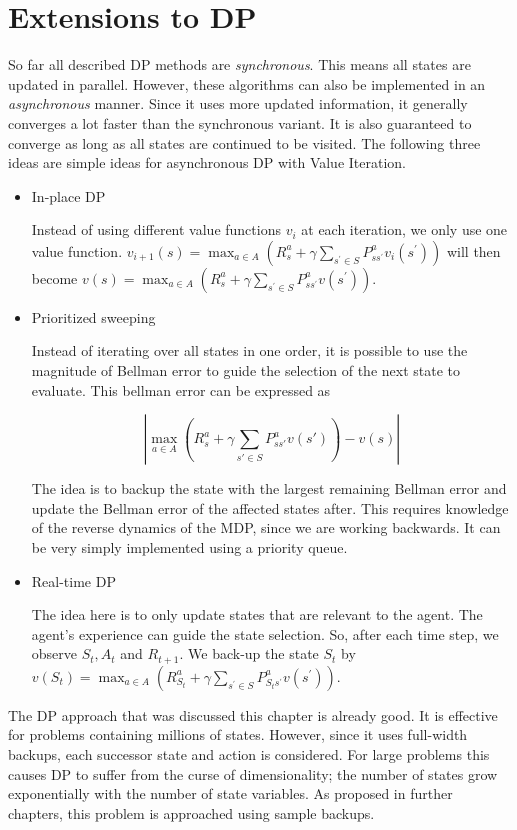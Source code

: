 \section{Extensions to DP}

So far all described DP methods are \textit{synchronous}. This means all states are updated in parallel. However, these algorithms can also be implemented in an \textit{asynchronous} manner. Since it uses more updated information, it generally converges a lot faster than the synchronous variant. It is also guaranteed to converge as long as all states are continued to be visited. The following three ideas are simple ideas for asynchronous DP with Value Iteration.

\begin{itemize}
	\item In-place DP
	
	Instead of using different value functions $v_i$ at each iteration, we only use one value function. $v_{i+1}(s) = \max_{a \in A} \left(R^a_s + \gamma \sum_{s^\prime \in S} P^a_{ss^\prime} v_i(s^\prime)\right)$ will then become $v(s) = \max_{a \in A} \left(R^a_s + \gamma \sum_{s^\prime \in S} P^a_{ss^\prime} v(s^\prime)\right)$.
	
	\item Prioritized sweeping
	
	Instead of iterating over all states in one order, it is possible to use the magnitude of Bellman error to guide the selection of the next state to evaluate. This bellman error can be expressed as 
	
	\begin{equation*}
		\left|\max_{a \in A} \left(R^a_s + \gamma \sum_{s' \in S} P^a_{ss'}v(s')\right) - v(s)\right|
	\end{equation*}

	The idea is to backup the state with the largest remaining Bellman error and update the Bellman error of the affected states after. This requires knowledge of the reverse dynamics of the MDP, since we are working backwards. It can be very simply implemented using a priority queue.
	
	\item Real-time DP
	
	The idea here is to only update states that are relevant to the agent. The agent's experience can guide the state selection. So, after each time step, we observe $S_t, A_t$ and $R_{t+1}$. We back-up the state $S_t$ by $v(S_t) = \max_{a \in A} \left(R^a_{S_t} + \gamma \sum_{s^\prime \in S} P^a_{S_{t}s^\prime} v(s^\prime)\right)$.
	
\end{itemize}

The DP approach that was discussed this chapter is already good. It is effective for problems containing millions of states. However, since it uses full-width backups, each successor state and action is considered. For large problems this causes DP to suffer from the curse of dimensionality; the number of states grow exponentially with the number of state variables. As proposed in further chapters, this problem is approached using sample backups.

